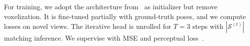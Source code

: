 

For training, we adopt the architecture from~\cite{jiang2025anysplat} as initializer but remove voxelization. It is fine-tuned partially with ground-truth poses, and we compute losses on novel views. The iterative head is unrolled for $T{=}3$ steps with $|\mathcal{S}^{(t)}|$ matching inference. We supervise with MSE and perceptual loss~\cite{zhang2018unreasonable}.




